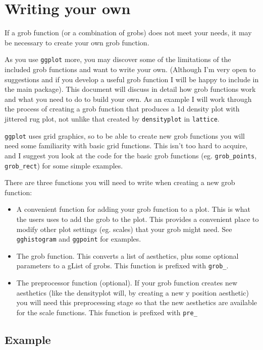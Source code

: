 \section{Writing your own}\label{sec:writing_your_own}

If a grob function (or a combination of grobs) does not meet your needs, it may be necessary to create your own grob function.  

As you use \texttt{ggplot} more, you may discover some of the limitations of the included grob functions and want to write your own.  (Although I'm very open to suggestions and if you develop a useful grob function I will be happy to include in the main package).  This document will discuss in detail how grob functions work and what you need to do to build your own.  As an example I will work through the process of creating a grob function that produces a 1d density plot with jittered rug plot, not unlike that created by \texttt{densityplot} in \texttt{lattice}.

\texttt{ggplot} uses grid graphics, so to be able to create new grob functions you will need some familiarity with basic grid functions.  This isn't too hard to acquire, and I suggest you look at the code for the basic grob functions (eg. \texttt{grob\_points}, \texttt{grob\_rect}) for some simple examples.

There are three functions you will need to write when creating a new grob function:

\begin{itemize}
	\item A convenient function for adding your grob function to a plot.  This is what the users uses to add the grob to the plot.  This provides a convenient place to modify other plot settings (eg. scales) that your grob might need.  See \texttt{gghistogram} and \texttt{ggpoint} for examples.
	\item The grob function.  This converts a list of aesthetics, plus some optional parameters to a gList of grobs.  This function is prefixed with \texttt{grob\_}.  
	\item The preprocessor function (optional).  If your grob function creates new aesthetics (like the densityplot will, by creating a new y position aesthetic) you will need this preprocessing stage so that the new aesthetics are available for the scale functions.  This function is prefixed with \texttt{pre\_}
\end{itemize}

\subsection{Example}\label{sub:example}

